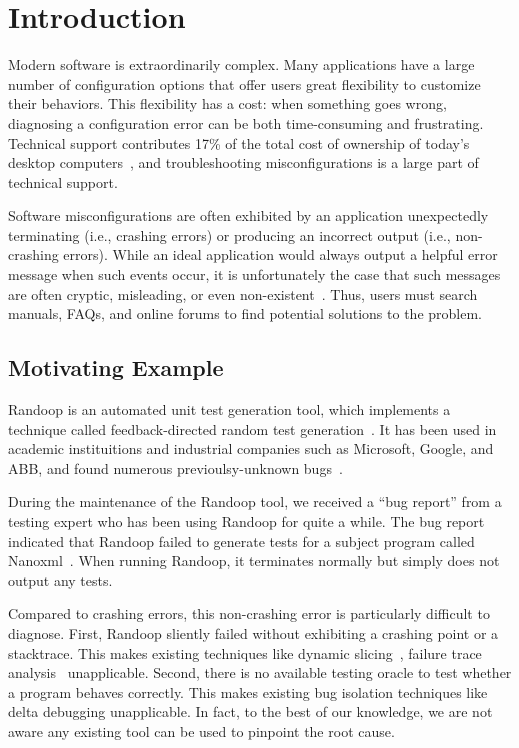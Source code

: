
\section{Introduction}
\label{sec:introduction}

Modern software is extraordinarily complex. Many applications have a large
number of configuration options that offer users great flexibility to
customize their behaviors. This flexibility has a cost: when something
goes wrong, diagnosing a configuration error can be both time-consuming
and frustrating. Technical support contributes 17\% of the total cost of ownership of
today's desktop computers~\cite{confevidence}, and troubleshooting misconfigurations
is a large part of technical support.

Software misconfigurations are often exhibited by an application unexpectedly terminating
(i.e., crashing errors) or producing an incorrect output (i.e., non-crashing errors). While an ideal application would always
output a helpful error message when such events occur, it is unfortunately
the case that such messages are often cryptic, misleading, or even non-existent~\cite{}.
Thus, users must search manuals, FAQs, and online forums to find potential
solutions to the problem. %

\subsection{Motivating Example}

Randoop is an automated unit test generation tool, which implements
a technique called feedback-directed random test generation~\cite{}.
It has been used in academic instituitions and
industrial companies such as Microsoft, Google,
and ABB, and found numerous previoulsy-unknown bugs~\cite{}.

During the maintenance of the Randoop tool, we received a ``bug report''
from a testing expert who has been using Randoop for quite a while.
The bug report indicated that Randoop failed to generate
tests for a subject program called Nanoxml~\cite{}. When running Randoop,
it terminates normally but simply does not output any tests.

Compared to crashing errors, this non-crashing error is particularly difficult to diagnose.
First, Randoop sliently failed without exhibiting a crashing point or
a stacktrace. This makes existing techniques like dynamic slicing~\cite{},
failure trace analysis~\cite{} unapplicable. Second, there is no
available testing oracle to test whether a program behaves correctly.
This makes existing bug isolation techniques like delta debugging
unapplicable. In fact, to the best of our knowledge, we are not
aware any existing tool can be used to pinpoint the root cause.

